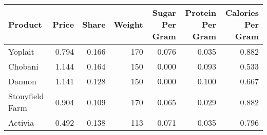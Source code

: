 \begin{tabular}{lrrrrrr}
\toprule
Product & Price & Share & Weight & Sugar Per Gram & Protein Per Gram & Calories Per Gram \\
\midrule
Yoplait & 0.794 & 0.166 & 170 & 0.076 & 0.035 & 0.882 \\
Chobani & 1.144 & 0.164 & 150 & 0.000 & 0.093 & 0.533 \\
Dannon & 1.141 & 0.128 & 150 & 0.000 & 0.100 & 0.667 \\
Stonyfield Farm & 0.904 & 0.109 & 170 & 0.065 & 0.029 & 0.882 \\
Activia & 0.492 & 0.138 & 113 & 0.071 & 0.035 & 0.796 \\
\bottomrule
\end{tabular}